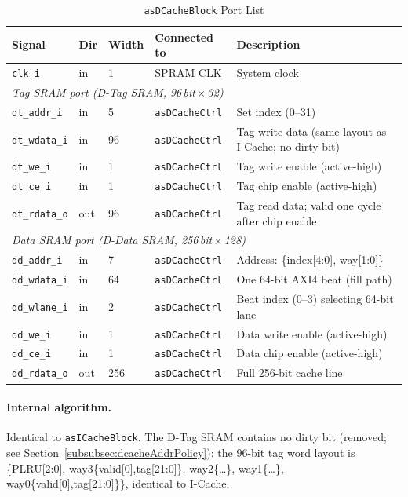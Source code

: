 \begin{table}[H]
\caption{\texttt{asDCacheBlock} Port List}
\label{tab:asDCacheBlockPorts}
\centering
\begin{tabularx}{\textwidth}{|l |l |l |l |X|}
  \hline
  Signal & Dir & Width & Connected to & Description \\
  \hline
  \hline
  \texttt{clk\_i}         & in  & 1   & SPRAM CLK             & System clock \\
  \hline
  \multicolumn{5}{|l|}{\textit{Tag SRAM port (D-Tag SRAM, 96\,bit\,$\times$\,32)}} \\
  \hline
  \texttt{dt\_addr\_i}    & in  & 5   & \texttt{asDCacheCtrl} & Set index (0--31) \\
  \hline
  \texttt{dt\_wdata\_i}   & in  & 96  & \texttt{asDCacheCtrl} & Tag write data (same layout as I-Cache; no dirty bit) \\
  \hline
  \texttt{dt\_we\_i}      & in  & 1   & \texttt{asDCacheCtrl} & Tag write enable (active-high) \\
  \hline
  \texttt{dt\_ce\_i}      & in  & 1   & \texttt{asDCacheCtrl} & Tag chip enable (active-high) \\
  \hline
  \texttt{dt\_rdata\_o}   & out & 96  & \texttt{asDCacheCtrl} & Tag read data; valid one cycle after chip enable \\
  \hline
  \multicolumn{5}{|l|}{\textit{Data SRAM port (D-Data SRAM, 256\,bit\,$\times$\,128)}} \\
  \hline
  \texttt{dd\_addr\_i}    & in  & 7   & \texttt{asDCacheCtrl} & Address: \{index[4:0], way[1:0]\} \\
  \hline
  \texttt{dd\_wdata\_i}   & in  & 64  & \texttt{asDCacheCtrl} & One 64-bit AXI4 beat (fill path) \\
  \hline
  \texttt{dd\_wlane\_i}   & in  & 2   & \texttt{asDCacheCtrl} & Beat index (0--3) selecting 64-bit lane \\
  \hline
  \texttt{dd\_we\_i}      & in  & 1   & \texttt{asDCacheCtrl} & Data write enable (active-high) \\
  \hline
  \texttt{dd\_ce\_i}      & in  & 1   & \texttt{asDCacheCtrl} & Data chip enable (active-high) \\
  \hline
  \texttt{dd\_rdata\_o}   & out & 256 & \texttt{asDCacheCtrl} & Full 256-bit cache line \\
  \hline
\end{tabularx}
\end{table}

\paragraph{Internal algorithm.}
Identical to \texttt{asICacheBlock}.
The D-Tag SRAM contains no dirty bit (removed; see
Section~\ref{subsubsec:dcacheAddrPolicy}): the 96-bit tag word layout
is \{PLRU[2:0], way3\{valid[0],tag[21:0]\}, way2\{\ldots\},
way1\{\ldots\}, way0\{valid[0],tag[21:0]\}\}, identical to I-Cache.

